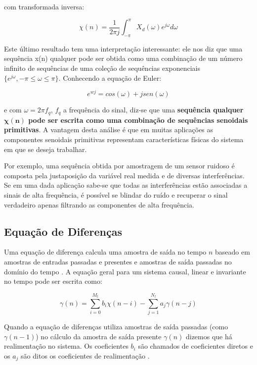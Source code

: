 {com transformada inversa:

\begin{equation}
\label{eq:DFT-inverse-transform}
\chi(n) = \frac{1}{2 \pi j} \int _{- \pi}^{\pi} X_d(\omega) e^{j\omega}d\omega
\end{equation}

Este último resultado tem uma interpretação interessante: ele nos diz que uma
sequência x(n) qualquer pode ser obtida como uma combinação de um número
infinito de sequências de uma coleção de sequências exponenciais $\{e^{j\omega},
-\pi \leq \omega \leq \pi \}$. Conhecendo a equação de Euler:

\begin{equation}
\label{eq:euler-equation}
e^{wj} = cos(\omega) + j sen(\omega)
\end{equation}

e com $\omega = 2\pi f_q$, $f_q$ a frequência do sinal, diz-se que uma
\textbf{sequência qualquer $\bm{\chi(n)}$ pode ser escrita como uma combinação
de sequências senoidais primitivas}. A vantagem desta análise é que em muitas
aplicações as componentes senoidais primitivas representam características
físicas do sistema em que se deseja trabalhar. 

Por exemplo, uma sequência obtida por amostragem de um sensor ruidoso é composta
pela justaposição da variável real medida e de diversas interferências. Se em
uma dada aplicação sabe-se que todas as interferências estão associadas a sinais
de alta frequência, é possível se blindar do ruído e recuperar o sinal
verdadeiro apenas filtrando as componentes de alta frequência.

\subsection{Equação de Diferenças}

Uma equação de diferença calcula uma amostra de saída no tempo $n$ baseado em
amostras de entradas passadas e presentes e amostras de saída passadas no
domínio do tempo \cite{classnote-on-difference-equation}. A equação geral para
um sistema causal, linear e invariante no tempo pode ser escrita como:

\begin{equation}
\gamma(n) = \sum_{i=0}^{M_l}b_i \chi(n-i) - \sum_{j=1}^{N_l}a_j \gamma(n-j) 
\end{equation}

Quando a equação de diferenças utiliza amostras de saída passadas (como
$\gamma(n-1)$) no cálculo da amostra de saída presente $\gamma(n)$ dizemos que
há realimentação no sistema. Os coeficientes $b_i$ são chamados de coeficientes
diretos e os $a_j$ são ditos os coeficientes de realimentação
\cite{classnote-on-difference-equation}.

}
